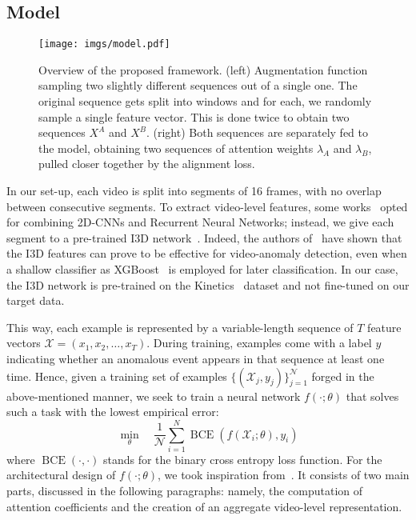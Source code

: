\documentclass[runningheads]{llncs}
\begin{document}
\subsection{Model}\label{sec:model}
\begin{figure}[t]
    \centering
    \texttt{[image: imgs/model.pdf]}
    \caption{Overview of the proposed framework. (left) Augmentation function sampling two slightly different sequences out of a single one. The original sequence gets split into windows and for each, we randomly sample a single feature vector. This is done twice to obtain two sequences $X^A$ and $X^B$. (right) Both sequences are separately fed to the model, obtaining two sequences of attention weights $\lambda_A$ and $\lambda_B$, pulled closer together by the alignment loss.}
    \label{fig:model}
\end{figure}
In our set-up, each video is split into segments of 16 frames, with no overlap between consecutive segments. To extract video-level features, some works~\cite{yue2015beyond,cascianelli2019role} opted for combining 2D-CNNs and Recurrent Neural Networks; instead, we give each segment to a pre-trained I3D network~\cite{carreira2017quo}. Indeed, the authors of~\cite{koshti2020video} have shown that the I3D features can prove to be effective for video-anomaly detection, even when a shallow classifier as XGBoost~\cite{chen2016xgboost,candeloro2020predicting} is employed for later classification. In our case, the I3D network is pre-trained on the Kinetics~\cite{kay2017kinetics} dataset and not fine-tuned on our target data. 

This way, each example is represented by a variable-length sequence of $T$ feature vectors $\mathcal{X} = (x_1, x_2, \dots, x_T)$. During training, examples come with a label $y$ indicating whether an anomalous event appears in that sequence at least one time. Hence, given a training set of examples $\{(\mathcal{X}_j,y_j)\}_{j = 1}^{\mathcal{N}}$ forged in the above-mentioned manner, we seek to train a neural network $f(\cdot; \theta)$ that solves such a task with the lowest empirical error:
\begin{equation}
\min_{\theta} \quad \frac{1}{\mathcal{N}}\sum_{i=1}^{N}{\operatorname{BCE}(f(\mathcal{X}_i; \theta), y_i)}
\end{equation}
where $\operatorname{BCE}(\cdot, \cdot)$ stands for the binary cross entropy loss function.
For the architectural design of $f(\cdot; \theta)$, we took inspiration from~\cite{nguyen2018weakly}. It consists of two main parts, discussed in the following paragraphs: namely, the computation of attention coefficients and the creation of an aggregate video-level representation. 
\end{document}

